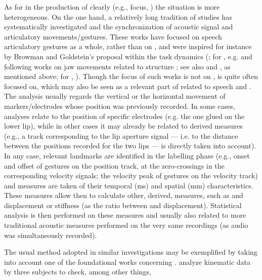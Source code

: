 \documentclass[output=paper]{langsci/langscibook}
\begin{document}
As for  in the production of clearly  (e.g.,  focus, ) the situation is more heterogeneous. On the one hand, a relatively long tradition of studies has systematically investigated  and the synchronization of acoustic signal and articulatory movements\slash gestures. These works have focused on speech articulatory gestures as a whole, rather than on , and were inspired for instance by Browman and Goldstein’s proposal within the task dynamics (\citealt{Browman1984,Browman1985}; for , e.g. \citealt{Edwards1991,Beckman1992} and following works on jaw movements related to  structure \citealt{Byrd1998,Byrd2003}; see also \citealt{GiliFivela2008book} and \citealt{Avesani2007}, as mentioned above; for , \citealt{DImperio.2007,PrietoETAL2007,Muecke2009}). Though the focus of such works is not on ,  is quite often focused on, which may also be seen as a relevant part of  related to speech and . The analysis usually regards the vertical or the horizontal movement of markers\slash electrodes whose position was previously recorded. In some cases, analyses relate to the position of specific electrodes (e.g. the one glued on the lower lip), while in other cases it may already be related to derived measures (e.g., a track corresponding to the lip aperture signal — i.e. to the distance between the positions recorded for the two lips — is directly taken into account). In any case, relevant landmarks are identified in the labelling phase (e.g., onset and offset of gestures on the position track, at the zero-crossings in the corresponding velocity signals; the velocity peak of gestures on the velocity track) and measures are taken of their temporal (ms) and spatial (mm) characteristics. These measures allow then to calculate other, derived, measures, such as  and displacement or  stiffness (as the ratio between  and displacement). Statistical analysis is then performed on these measures and usually also related to more traditional acoustic measures performed on the very same recordings (as audio was simultaneously recorded).

The usual method adopted in similar investigations may be exemplified by taking into account one of the foundational works concerning . \citet{Byrd1998} analyze kinematic data by three subjects to check, among other things,
\end{document}
